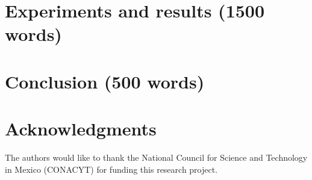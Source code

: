 \documentclass[pdftex,11pt,a4paper]{article}
\theoremstyle{definition}
\theoremstyle{remark}
\begin{document}
\section{Experiments and results (1500 words)}
\label{section_results}

\section{Conclusion (500 words)}
\label{section_conclusion}
\blindtext

\section*{Acknowledgments}


The authors would like to thank the National Council for Science and Technology in Mexico (CONACYT) for funding this research project.




\end{document}

